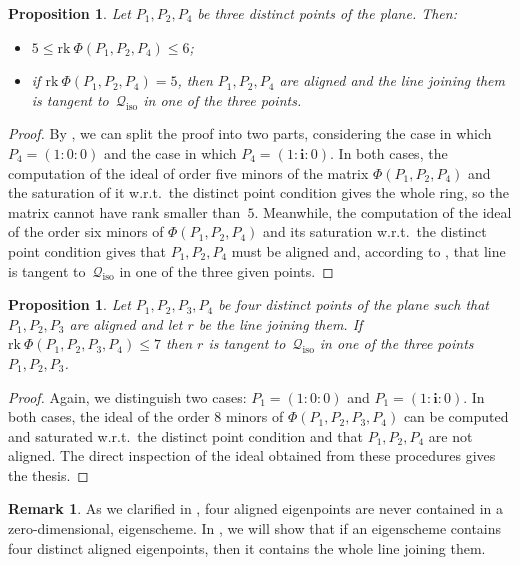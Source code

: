 \documentclass{amsart}
\theoremstyle{plain}
\newtheorem{prop}[lemma]{Proposition}
\theoremstyle{definition}
\newtheorem{rmk}[lemma]{Remark}
\newcommand{\iso}{\mathcal{Q}_{\mathrm{iso}}}
\newcommand{\iii}{\textbf{i}}
\newcommand{\rk}{\ensuremath{\mathrm{rk}}}
\begin{document}
\begin{prop}
\label{manca il riferimento su ancillary    non e': condition_rank_aligned}
Let $P_1, P_2, P_4$ be three distinct points of the plane. Then:
%
\begin{itemize}
 \item $5 \leq \rk \ \Phi(P_1, P_2, P_4) \leq 6$;
 \item if
 $\rk \ \Phi(P_1, P_2, P_4) = 5$, then $P_1, P_2, P_4$
 are aligned and the line joining them is tangent to~$\iso$
 in one of the three points.
\end{itemize}
%
\end{prop}
\begin{proof}
By , we can split the proof into two parts, considering the case in
which $P_4 = (1: 0: 0)$ and the case in which $P_4 = (1: \iii: 0)$.
In both cases, the computation of the ideal of order five minors of the matrix
$\Phi(P_1, P_2, P_4)$ and the saturation of it w.r.t.\ the distinct point condition gives the whole ring, so the matrix cannot have rank smaller than~$5$.
Meanwhile, the computation
of the ideal of the order six minors of $\Phi(P_1, P_2, P_4)$ and its
saturation w.r.t.\ the distinct point condition gives that
$P_1, P_2, P_4$ must be aligned and, according to ,
that line is tangent to~$\iso$ in one of the three given points.
\end{proof}


\begin{prop}
\label{prop:condition3+1}
Let $P_1, P_2, P_3, P_4$ be four distinct points of the plane such that
$P_1, P_2, P_3$ are aligned and let $r$
be the line joining them. If
$\rk \ \Phi(P_1, P_2, P_3, P_4) \leq 7$ then $r$ is tangent to~$\iso$ in one of the three points $P_1, P_2, P_3$.
\end{prop}
\begin{proof}
Again, we distinguish two cases: $P_1 = (1: 0: 0)$ and
$P_1 = (1: \iii: 0)$. In both cases, the ideal of the order $8$
minors of $\Phi(P_1, P_2, P_3, P_4)$ can be computed and saturated
w.r.t.\ the distinct point condition and that
$P_1, P_2, P_4$ are not aligned.
The direct inspection of the ideal obtained from these procedures gives the thesis.
\end{proof}

\begin{rmk}
 As we clarified in , four aligned eigenpoints are never contained in a zero-dimensional, eigenscheme. In , we will show that if an eigenscheme contains four distinct aligned eigenpoints, then it contains the whole line joining them.
\end{rmk}
\end{document}
